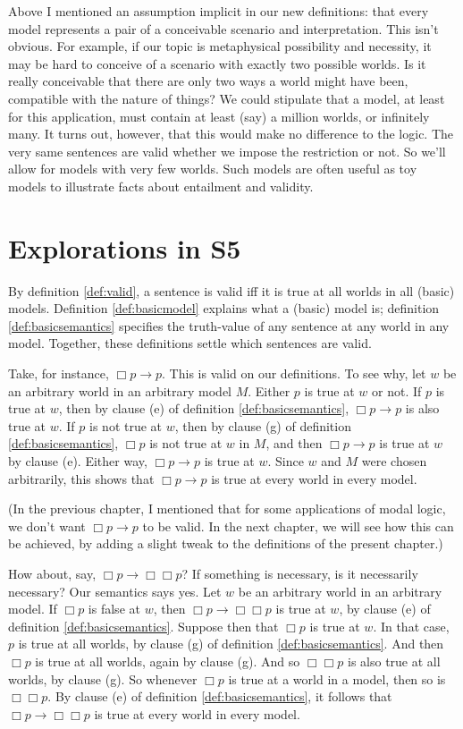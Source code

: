 Above I mentioned an assumption implicit in our new definitions: that every
model represents a pair of a conceivable scenario and interpretation. This isn't
obvious. For example, if our topic is metaphysical possibility and necessity, it
may be hard to conceive of a scenario with exactly two possible worlds. Is it
really conceivable that there are only two ways a world might have been,
compatible with the nature of things? We could stipulate that a model, at least
for this application, must contain at least (say) a million worlds, or
infinitely many. It turns out, however, that this would make no difference to
the logic. The very same sentences are valid whether we impose the restriction
or not. So we'll allow for models with very few worlds. Such models are often
useful as toy models to illustrate facts about entailment and validity.

\section{Explorations in S5}%
\label{sec:basiclogic}

By definition \ref{def:valid}, a sentence is valid iff it is true at all worlds
in all (basic) models. Definition \ref{def:basicmodel} explains what a (basic)
model is; definition \ref{def:basicsemantics} specifies the truth-value of any
sentence at any world in any model. Together, these definitions settle which
sentences are valid.

Take, for instance, $\Box p \to p$. This is valid on our definitions. To see
why, let $w$ be an arbitrary world in an arbitrary model $M$. Either $p$ is true
at $w$ or not. If $p$ is true at $w$, then by clause (e) of definition
\ref{def:basicsemantics}, $\Box p \to p$ is also true at $w$. If $p$ is not true
at $w$, then by clause (g) of definition \ref{def:basicsemantics}, $\Box p$ is
not true at $w$ in $M$, and then $\Box p \to p$ is true at $w$ by clause
(e). Either way, $\Box p \to p$ is true at $w$. Since $w$ and $M$ were chosen
arbitrarily, this shows that $\Box p \to p$ is true at every
world in every model.

(In the previous chapter, I mentioned that for some applications of modal logic,
we don't want $\Box p \to p$ to be valid. In the next chapter, we will see how
this can be achieved, by adding a slight tweak to the definitions of the present
chapter.)

How about, say, $\Box p \to \Box \Box p$? If something is necessary, is it
necessarily necessary? Our semantics says yes. Let $w$ be an arbitrary world in
an arbitrary model. If $\Box p$ is false at $w$, then $\Box p \to \Box\Box p$ is
true at $w$, by clause (e) of definition \ref{def:basicsemantics}. Suppose then
that $\Box p$ is true at $w$. In that case, $p$ is true at all worlds, by clause
(g) of definition \ref{def:basicsemantics}. And then $\Box p$ is true at all
worlds, again by clause (g). And so $\Box\Box p$ is also true at all worlds, by
clause (g). So whenever $\Box p$ is true at a world in a model, then so is
$\Box\Box p$. By clause (e) of definition \ref{def:basicsemantics}, it follows
that $\Box p \to \Box\Box p$ is true at every world in every model.


